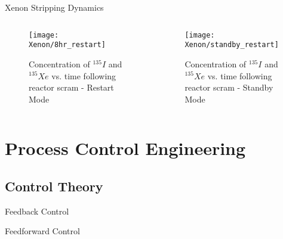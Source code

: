 \documentclass[aspectratio=169,pdftex,dvipsnames]{beamer}
\newcommand{\I}[1][135]{$^{#1}I$ }
\newcommand{\Xe}[1][135]{$^{#1}Xe$ }
\begin{document}
\begin{frame}{Xenon Stripping Dynamics}
    \begin{columns}
        \begin{column}{0.5\textwidth}
            \begin{figure}[ht!]
                \centering
                \texttt{[image: Xenon/8hr\_restart]}\caption{Concentration of \I and \Xe vs. time following reactor scram - Restart Mode}
            \end{figure}
        \end{column}
        \begin{column}{0.5\textwidth}
            \begin{figure}[ht!]
                \centering
                \texttt{[image: Xenon/standby\_restart]}
                \caption{Concentration of \I and \Xe vs. time following reactor scram - Standby Mode}
            \end{figure}
        \end{column}
    \end{columns}
\end{frame}

\section{Process Control Engineering}
\subsection{Control Theory}
\begin{frame}{Feedback Control}
    \begin{figure}[!ht]
        \centering
        \resizebox{\textwidth}{!}{}
    \end{figure}
\end{frame}

\begin{frame}{Feedforward Control}
    \begin{figure}[!ht]
        \centering
        \resizebox{\textwidth}{!}{}
    \end{figure}
\end{frame}
\end{document}
